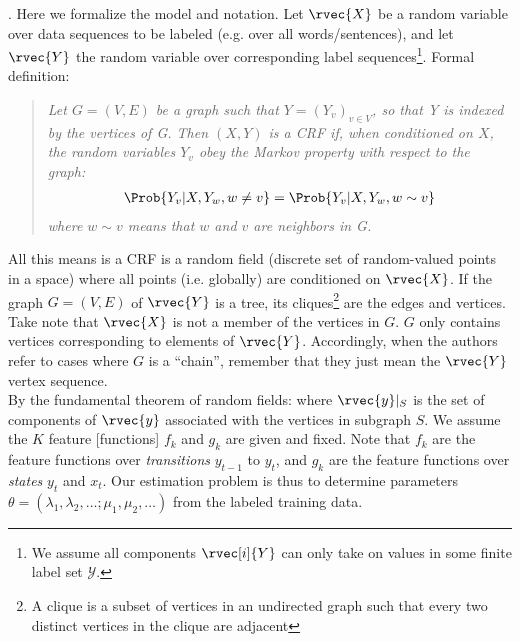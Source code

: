 \documentclass[11pt]{article}
\begin{document}
\myspace
\p {}. Here we formalize the model and notation. Let $\rvec{X}$ be a random variable over data sequences to be labeled (e.g. over all words/sentences), and let $\rvec{Y}$ the random variable over corresponding label sequences\footnote{We assume all components $\rvec[i]{Y}$ can only take on values in some finite label set $\mathcal{Y}$.}. Formal definition: 
\vspace{-1em}
\begin{quote}
	{\small \textit{Let $G = (V, E)$ be a graph such that $Y = (Y_v)_{v \in V}$, so that Y is indexed by the vertices of G. Then $(X, Y)$ is a CRF if, when conditioned on $X$, the random variables $Y_v$ obey the Markov property with respect to the graph:
			\begin{align}
			\Prob{Y_v | X, Y_w , w \ne v} =  \Prob{Y_v | X, Y_w , w \sim v}
			\end{align}
			where $w \sim v$ means that $w$ and $v$ are neighbors in G.}}
\end{quote}
All this means is a CRF is a random field (discrete set of random-valued points in a space) where all points (i.e. globally) are conditioned on $\rvec{X}$. If the graph $G = (V, E)$ of $\rvec{Y}$ is a tree, its cliques\footnote{A clique is a subset of vertices in an undirected graph such that every two distinct vertices in the clique are adjacent} are the edges and vertices. Take note that $\rvec{X}$ is not a member of the vertices in $G$. $G$ only contains vertices corresponding to elements of $\rvec{Y}$. Accordingly, when the authors refer to cases where $G$ is a ``chain'', remember that they just mean the $\rvec{Y}$ vertex sequence.  \\

\p By the fundamental theorem of random fields:
where $\rvec{y}|_S$ is the set of components of $\rvec{y}$ associated with the vertices in subgraph $S$. We assume the $K$ feature [functions] $f_k$ and $g_k$ are given and fixed. Note that $f_k$ are the feature functions over \textit{transitions} $y_{t-1}$ to $y_t$, and $g_k$ are the feature functions over \textit{states} $y_t$ and $x_t$. Our estimation problem is thus to determine parameters $\theta = (\lambda_1, \lambda_2, \ldots; \mu_1, \mu_2, \ldots)$ from the labeled training data.
\end{document}
